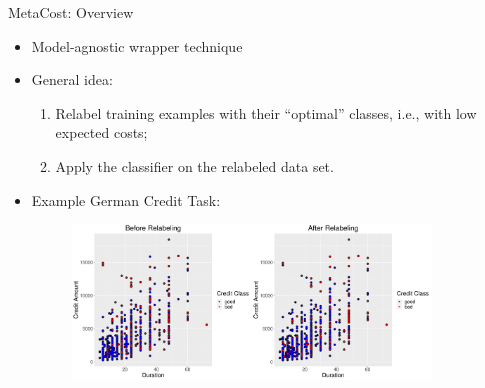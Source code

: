 \documentclass[11pt,compress,t,notes=noshow, xcolor=table]{beamer}
\begin{document}
\begin{vbframe}{MetaCost: Overview}


        \begin{itemize}
            \item Model-agnostic wrapper technique                      
            \item General idea: 
                \begin{enumerate}
                    \item Relabel training examples with their ``optimal'' classes, i.e., with low expected costs;
                   
                    \item Apply the classifier on the relabeled data set.
                \end{enumerate} 
                \item Example German Credit Task:
                                \begin{figure}[h]
            \centering
            \includegraphics[width=0.9\textwidth]{slides/imbalanced-learning/figure_man/Relabeling_viz.png}
        \end{figure}
                
        \end{itemize}

\end{vbframe}
\end{document}
